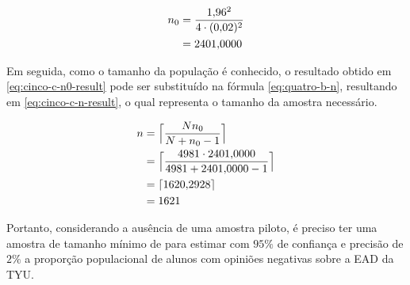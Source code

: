 	\begin{align}
		n_0 
			&= \frac{\num{1.96}^2}{4 \cdot (\num{0.02})^2} \nonumber \\
			&= \label{eq:cinco-c-n0-result}
			   \num{2401.0000}
	\end{align}

	Em seguida, como o tamanho da população é conhecido, o resultado obtido
	em \eqref{eq:cinco-c-n0-result} pode ser substituído na fórmula
	\eqref{eq:quatro-b-n}, resultando em \eqref{eq:cinco-c-n-result}, o qual
	representa o tamanho da amostra necessário.

	\begin{align}
		n &= \Big\lceil \frac{N n_0}{N + n_0 - 1} \nonumber \Big\rceil \\
		  &= \Big\lceil \frac{4981 \cdot \num{2401.0000}}{4981 + \num{2401.0000} - 1}
		  \nonumber \Big\rceil \\
		  &= \lceil \num{1620.2928} \nonumber \rceil\\
		  &= \label{eq:cinco-c-n-result} 
			 1621
	\end{align}

	Portanto, considerando a ausência de uma amostra piloto, é preciso ter
	uma amostra de tamanho mínimo de \CINCOCnceil para estimar com $95\%$ de
	confiança e precisão de $2\%$ a proporção populacional de alunos com
	opiniões negativas sobre a EAD da TYU.
